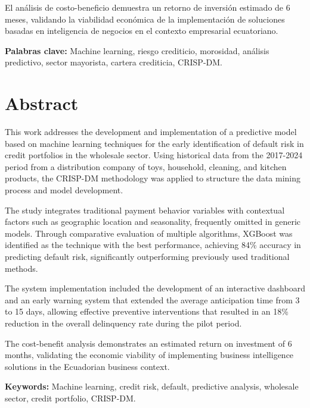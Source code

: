El análisis de costo-beneficio demuestra un retorno de inversión estimado de 6 meses, validando la viabilidad económica de la implementación de soluciones basadas en inteligencia de negocios en el contexto empresarial ecuatoriano.

\textbf{Palabras clave:} Machine learning, riesgo crediticio, morosidad, análisis predictivo, sector mayorista, cartera crediticia, CRISP-DM.

\newpage

\chapter*{Abstract}
\thispagestyle{empty}

This work addresses the development and implementation of a predictive model based on machine learning techniques for the early identification of default risk in credit portfolios in the wholesale sector. Using historical data from the 2017-2024 period from a distribution company of toys, household, cleaning, and kitchen products, the CRISP-DM methodology was applied to structure the data mining process and model development.

The study integrates traditional payment behavior variables with contextual factors such as geographic location and seasonality, frequently omitted in generic models. Through comparative evaluation of multiple algorithms, XGBoost was identified as the technique with the best performance, achieving 84\% accuracy in predicting default risk, significantly outperforming previously used traditional methods.

The system implementation included the development of an interactive dashboard and an early warning system that extended the average anticipation time from 3 to 15 days, allowing effective preventive interventions that resulted in an 18\% reduction in the overall delinquency rate during the pilot period.

The cost-benefit analysis demonstrates an estimated return on investment of 6 months, validating the economic viability of implementing business intelligence solutions in the Ecuadorian business context.

\textbf{Keywords:} Machine learning, credit risk, default, predictive analysis, wholesale sector, credit portfolio, CRISP-DM.